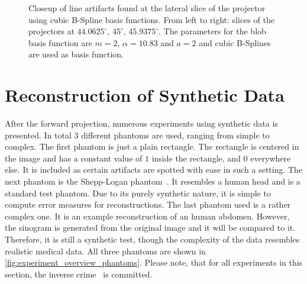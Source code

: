 \begin{figure}
	\centering

	\caption{Closeup of line artifacts found at the lateral slice of the projector using cubic
		B-Spline basis functions. From left to right: slices of the projectors at
		\(44.0625^\circ\), \(45^\circ\), \(45.9375^\circ\). The parameters for the blob
		basis function are \(m=2\), \(\alpha=10.83\) and \(a=2\) and cubic B-Splines are
		used as basis function.
	}\label{fig:sinogram_bspline_3d_closeup}
\end{figure}

\section{Reconstruction of Synthetic Data}\label{sec:experiments_synthethic_projection}

After the forward projection, numerous experiments using synthetic data is presented. In total 3
different phantoms are used, ranging from simple to complex. The first phantom is just a plain
rectangle. The rectangle is centered in the image and has a constant value of \(1\) inside the
rectangle, and \(0\) everywhere else. It is included as certain artifacts are spotted with ease in
such a setting. The next phantom is the Shepp-Logan phantom~\cite{shepp_fourier_1974}. It resembles
a human head and is a standard test phantom. Due to its purely synthetic nature, it is simple to
compute error measures for reconstructions. The last phantom used is a rather complex one. It is an
example reconstruction of an human abdomen. However, the sinogram is generated from the original
image and it will be compared to it. Therefore, it is still a synthetic test, though the complexity
of the data resembles realistic medical data. All three phantoms are shown in
\autoref{fig:experiment_overview_phantoms}. Please note, that for all experiments in this section,
the inverse crime~\cite{wirgin_inverse_2004} is committed.

